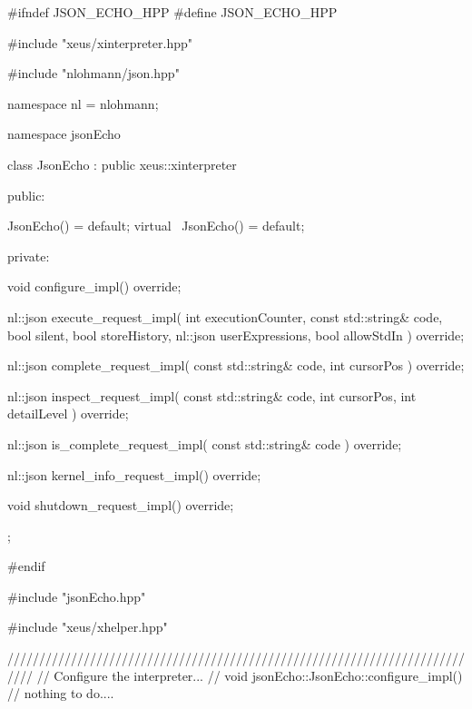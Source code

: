 
\begintext

\startCHeader

#ifndef JSON_ECHO_HPP
#define JSON_ECHO_HPP

#include "xeus/xinterpreter.hpp"

#include "nlohmann/json.hpp"

namespace nl = nlohmann;

namespace jsonEcho {

  class JsonEcho : public xeus::xinterpreter {

  public:

    JsonEcho() = default;
    virtual ~JsonEcho() = default;

  private:

    void configure_impl() override;

    nl::json execute_request_impl(
      int executionCounter,
      const std::string& code,
      bool silent,
      bool storeHistory,
      nl::json userExpressions,
      bool allowStdIn
    ) override;

  nl::json complete_request_impl(
    const std::string& code,
    int cursorPos
  ) override;

  nl::json inspect_request_impl(
    const std::string& code,
    int cursorPos,
    int detailLevel
  ) override;

  nl::json is_complete_request_impl(
    const std::string& code
  ) override;

  nl::json kernel_info_request_impl() override;

  void shutdown_request_impl() override;

  };

}

#endif
\stopCHeader


\startCCode
#include "jsonEcho.hpp"

#include "xeus/xhelper.hpp"

////////////////////////////////////////////////////////////////////////////
// Configure the interpreter...
//
void jsonEcho::JsonEcho::configure_impl(){
  // nothing to do....
}


